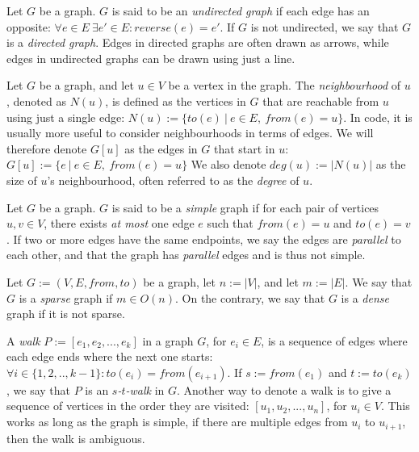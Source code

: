 \begin{definition}
    Let $G$ be a graph. $G$ is said to be an \emph{undirected graph} if each edge has an opposite: $\forall e \in E ~ \exists e' \in E : reverse(e) = e'$.
    If $G$ is not undirected, we say that $G$ is a \emph{directed graph}.
    Edges in directed graphs are often drawn as arrows, while edges in undirected graphs can be drawn using just a line.
\end{definition}

\begin{definition}[Neighbourhood]
    Let $G$ be a graph, and let $u \in V$ be a vertex in the graph. The \emph{neighbourhood} of $u$, denoted as $N(u)$, is defined as the vertices in $G$ that are reachable from $u$ using just a single edge: $N(u) := \{ to(e)  ~|~  e \in E, ~ from(e) = u\}$. 
    In code, it is usually more useful to consider neighbourhoods in terms of edges. We will therefore denote $G[u]$ as the edges in $G$ that start in $u$: $G[u] := \{e ~ | ~ e \in E, ~ from(e) = u\}$
    We also denote $deg(u) := |N(u)|$ as the size of $u$'s neighbourhood, often referred to as the \emph{degree} of $u$.
\end{definition}

\begin{definition}
    Let $G$ be a graph. $G$ is said to be a \emph{simple} graph if for each pair of vertices $u,v \in V$, there exists \emph{at most} one edge $e$ such that $from(e) = u$ and $to(e) = v$. If two or more edges have the same endpoints, we say the edges are \emph{parallel} to each other, and that the graph has \emph{parallel} edges and is thus not simple.
\end{definition}

\begin{definition}
    Let $G := (V, E, from, to)$ be a graph, let $n := |V|$, and let $m := |E|$. We say that $G$ is a \emph{sparse} graph if $m \in O(n)$. On the contrary, we say that $G$ is a \emph{dense} graph if it is not sparse.
\end{definition}

\begin{definition}[Walk]
    A \emph{walk} $P := [e_1, e_2, ..., e_k]$ in a graph $G$, for $e_i \in E$, is a sequence of edges where each edge ends where the next one starts: $\forall i \in \{1,2,..,k-1\} : to(e_i) = from(e_{i+1})$.
    If $s := from(e_1)$ and $t := to(e_k)$, we say that $P$ is an \emph{$s$-$t$-walk} in $G$.
    Another way to denote a walk is to give a sequence of vertices in the order they are visited: $[u_1, u_2, ..., u_n]$, for $u_i \in V$. This works as long as the graph is simple, if there are multiple edges from $u_i$ to $u_{i+1}$, then the walk is ambiguous.
\end{definition}

